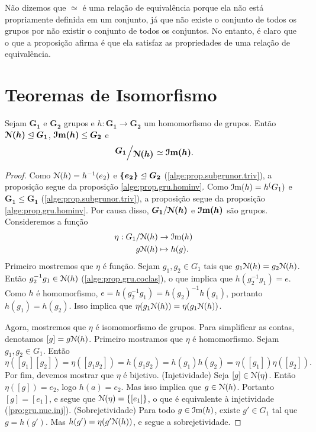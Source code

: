 Não dizemos que $\simeq$ é uma relação de equivalência porque ela não está propriamente definida em um conjunto, já que não existe o conjunto de todos os grupos por não existir o conjunto de todos os conjuntos. No entanto, é claro que o que a proposição afirma é que ela satisfaz as propriedades de uma relação de equivalência.

\section{Teoremas de Isomorfismo}

\begin{teo}
Sejam $\bm{G_1}$ e $\bm{G_2}$ grupos e $h: \bm{G_1} \to \bm{G_2}$ um homomorfismo de grupos. Então $\bm{\mathcal{N}(h)} \mathrel{\unlhd} \bm{G_1}$, $\bm{\mathcal{I}\mathrm{m}(h)} \leq \bm{G_2}$ e 
	\begin{equation*}
	\bm{\quo{G_1}{\nuc(h)}} \simeq \bm{\im(h)}.
	\end{equation*}
\end{teo}
\begin{proof} Como $\mathcal{N}(h) = h^{-1}(e_2)$ e $\bm{\{e_2\}} \mathrel{\unlhd} \bm{G_2}$ (\ref{alge:prop.subgrunor.triv}), a proposição segue da proposição \ref{alge:prop.gru.hominv}. Como $\mathcal{I}\mathrm{m}(h) = h^(G_1)$ e $\bm{G_1} \leq \bm{G_1}$ (\ref{alge:prop.subgrunor.triv}), a proposição segue da proposição \ref{alge:prop.gru.hominv}. Por causa disso, $\bm{G_1}/\bm{\mathcal{N}(h)}$ e $\bm{\mathcal{I}\mathrm{m}(h)}$ são grupos. Consideremos a função
		\begin{align*}
		\eta: G_1 / \mathcal{N}(h) &\to \mathcal{I}\mathrm{m}(h) \\
			g\mathcal{N}(h) &\mapsto h(g).
		\end{align*}
Primeiro mostremos que $\eta$ é função. Sejam $g_1,g_2 \in G_1$ tais que $g_1\mathcal{N}(h) = g_2\mathcal{N}(h)$. Então $g_2^{-1}g_1 \in \mathcal{N}(h)$ (\ref{alge:prop.gru.coclas}), o que implica que $h(g_2^{-1}g_1) = e$. Como $h$ é homomorfismo, $e = h(g_2^{-1}g_1) = h(g_2)^{-1}h(g_1)$, portanto $h(g_1)=h(g_2)$. Isso implica que $\eta(g_1\mathcal{N}(h))=\eta(g_1\mathcal{N}(h))$.

Agora, mostremos que $\eta$ é isomomorfismo de grupos. Para simplificar as contas, denotamos $[g] = g\mathcal{N}(h)$. Primeiro mostramos que $\eta$ é homomorfismo. Sejam $g_1,g_2 \in G_1$. Então
	\begin{equation*}
	\eta([g_1][g_2]) = \eta([g_1g_2]) = h(g_1g_2) = h(g_1)h(g_2) = \eta([g_1])\eta([g_2]).
	\end{equation*}
Por fim, devemos mostrar que $\eta$ é bijetivo. (Injetividade) Seja $[g] \in \mathcal{N}(\eta)$. Então $\eta([g])=e_{2}$, logo $h(a)=e_2$. Mas isso implica que $g \in \mathcal{N}(h)$. Portanto $[g]=[e_1]$, e segue que $\mathcal{N}(\eta)=\{[e_1]\}$, o que é equivalente à injetividade (\ref{pro:gru.nuc.inj}). (Sobrejetividade) Para todo $g \in \mathcal{I}\mathrm{m}(h)$, existe $g' \in G_1$ tal que $g=h(g')$. Mas $h(g')=\eta(g'\mathcal{N}(h))$, e segue a sobrejetividade.
\end{proof}

